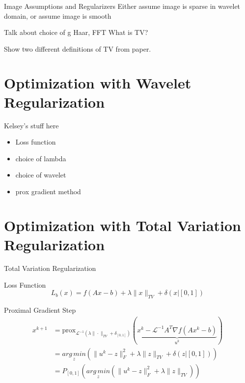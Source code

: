 \documentclass[12pt]{beamer}
\newcommand{\AMz}{\underset{z}{arg\, min}}
\newcommand{\prox}{\text{prox}}
\begin{document}
\begin{frame}{Image Assumptions and Regularizers}
Either assume image is sparse in wavelet domain, or assume image is smooth

Talk about choice of g
Haar, FFT
What is TV?

Show two different definitions of TV from paper.
\end{frame}

\section{Optimization with Wavelet Regularization}

\begin{frame}{Kelsey's stuff here}
\begin{itemize}
\item Loss function
\item choice of lambda
\item choice of wavelet
\item prox gradient method
\end{itemize}

\end{frame}

\section{Optimization with Total Variation Regularization}

\begin{frame}{Total Variation Regularization}

\begin{exampleblock}{Loss Function}
$$
L_b(x) = f(Ax-b) + \lambda \|x\|_{TV} + \delta(x | [0,1])
$$
\end{exampleblock}

\begin{exampleblock}{Proximal Gradient Step}
\begin{align*}
x^{k+1} &= \prox_{\mathcal{L}^{-1}(\lambda \|\cdot \|_{TV} + \delta_{[0,1]})} (\underbrace{x^k - \mathcal{L}^{-1} A^T\nabla f (Ax^k - b)}_{u^k}) \\
&= \AMz \left( \|u^k - z\|_F^2 + \lambda \|z\|_{TV} + \delta(z | [0,1]) \right) \\
&= P_{[0,1]}  \left( \AMz \left( \|u^k - z\|_F^2 + \lambda \|z\|_{TV} \right) \right)
\end{align*}
\end{exampleblock}

\end{frame}
\end{document}
